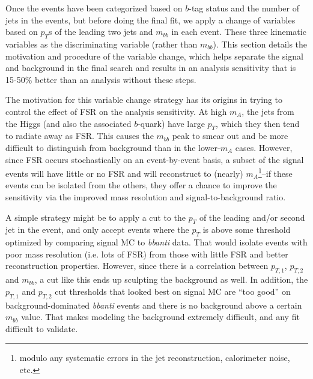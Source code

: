 Once the events have been categorized based on $b$-tag status and the number of jets in the
events, but before doing the final fit, we apply a change of variables based on
$p_T$s of the leading two jets and $m_{bb}$ in each event.  These three kinematic variables
as the discriminating variable (rather than $m_{bb}$).  This section details the 
motivation and procedure of the variable change, which helps separate the
signal and background in the final search and results in an analysis 
sensitivity that is 15-50\% better than an analysis without these steps.



The motivation for this variable change strategy has its origins in trying to control the effect of
FSR on the analysis sensitivity.  At high $m_A$, the jets from the Higgs (and also 
the associated $b$-quark) have large $p_T$, which they then tend to radiate away 
as FSR.  This causes the $m_{bb}$ peak to smear out and be more difficult to 
distinguish from background than in the lower-$m_A$ cases.  However, since FSR
occurs stochastically on an event-by-event basis, a subset of the signal events
will have little or no FSR and will reconstruct to (nearly) $m_A$\footnote{modulo any
systematic errors in the jet reconstruction, calorimeter noise, etc.}--if these events 
can be isolated from the others, they offer a chance to improve the sensitivity
via the improved mass resolution and signal-to-background ratio. 

A simple strategy might be to apply a cut to the $p_T$ of the leading and/or 
second jet in the event, and only accept events where the $p_T$ is above some
threshold optimized by comparing signal MC to \textit{bbanti} data.  
That would isolate events with poor mass resolution (i.e. lots of FSR) from
those with little FSR and better reconstruction properties.  However, since
there is a correlation between $p_{T,1}$, $p_{T,2}$ and $m_{bb}$, a cut like
this ends up sculpting the background as well.  In addition, the $p_{T,1}$ and
$p_{T,2}$ cut thresholds that looked best on signal MC are ``too good'' on 
background-dominated \textit{bbanti} events and there is no background
above a certain $m_{bb}$ value.  That makes modeling the background extremely 
difficult, and any fit difficult to validate.  

